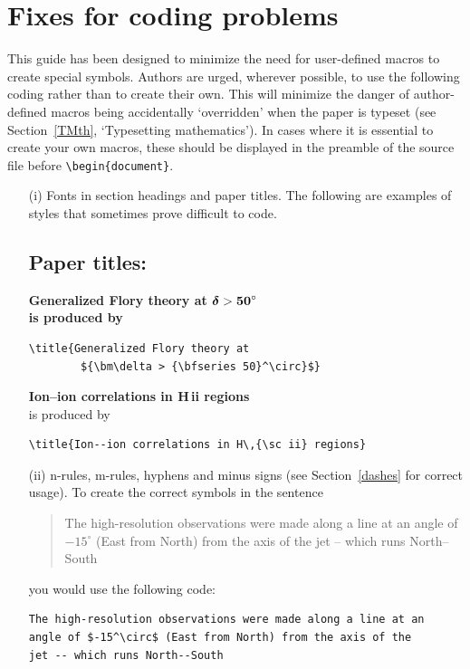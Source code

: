 \documentclass[]{tRSL2e}
\begin{document}
\section{Fixes for coding problems}

This guide has been designed to minimize the need for user-defined macros to  create special symbols. Authors
are urged, wherever possible, to use the following coding rather than to create their own. This will minimize
the danger of author-defined macros being accidentally `overridden' when the paper is typeset (see
Section~\ref{TMth}, `Typesetting mathematics'). In cases where it is essential to create your own macros,
these should be displayed in the preamble of the source file before \verb"\begin{document}".

%
\begin{enumerate}
\item[(i)] Fonts in section headings and paper titles. The following are  examples
of styles that sometimes prove difficult to code.

\subsection*{Paper titles:}

\bf{\noindent Generalized Flory theory at ${\bm\delta >
{\bf 50}^\circ}$}\\

    \noindent\normalfont is produced by
\begin{verbatim}
\title{Generalized Flory theory at
        ${\bm\delta > {\bfseries 50}^\circ}$}
\end{verbatim}
\bigskip

{\bf{\noindent Ion--ion correlations in H\,{\sc ii} regions}}\\

\noindent\normalfont is produced by
%
\begin{verbatim}
\title{Ion--ion correlations in H\,{\sc ii} regions}
\end{verbatim}



\item[(ii)] n-rules, m-rules, hyphens and minus signs (see Section~\ref{dashes} for
correct usage). To create the correct symbols in the sentence
%
\begin{quote}
The high-resolution observations were made along a line at an
angle of $-15^\circ$ (East from North) from the axis of the
jet -- which runs North--South
\end{quote}
you would use the following code:
%
\begin{verbatim}
The high-resolution observations were made along a line at an
angle of $-15^\circ$ (East from North) from the axis of the
jet -- which runs North--South
\end{verbatim}


\end{enumerate}
\end{document}
